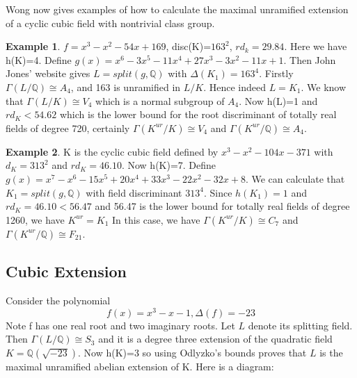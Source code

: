 \documentclass[12pt]{extarticle}
\newcommand{\Q}{\mathbb{Q}}
\newcommand{\<}{\langle}
\renewcommand{\>}{\rangle}
\theoremstyle{definition}
\newtheorem*{example}{Example}
\begin{document}
Wong now gives examples of how to calculate the maximal unramified extension of a cyclic cubic field with nontrivial class group. \begin{example}
    $f=x^3-x^2-54x+169$, disc(K)=$163^2$, $rd_{k}=29.84$. Here we have h(K)=4. Define $g(x)=x^6-3x^5-11x^4+27x^3-3x^2-11x+1$. Then John Jones' website gives $L = split(g,\mathbb{Q})$ with $\Delta(K_1)=163^4$. Firstly $\Gamma(L/\mathbb{Q}) \cong A_4$, and 163 is unramified in $L/K$. Hence indeed $L=K_1$. We know that $\Gamma(L/K)\cong V_4$ which is a normal subgroup of $A_4$. Now h(L)=1 and $rd_K < 54.62$ which is the lower bound for the root discriminant of totally real fields of degree 720, certainly $\Gamma(K^{ur}/K) \cong V_4$ and $\Gamma(K^{ur}/\mathbb{Q}) \cong A_4$. 
\end{example}
\begin{example}
K is the cyclic cubic field defined by $x^3-x^2-104x-371$ with $d_K = 313^2$
and $rd_{K} = 46.10$. Now h(K)=7. Define $g(x) = x^7-x^6-15x^5+20x^4+33x^3-22x^2-32x+8$. We can calculate that $K_1=split(g,\Q)$ with field discriminant $313^4$. Since $h(K_1) = 1$ and $rd_K = 46.10 < 56.47$ and 56.47 is the lower
bound for totally real fields of degree 1260, we have $K^{ur}=K_1$ In this
case, we have $\Gamma(K^{ur}/K) \cong C_7$ and $\Gamma(K^{ur}/\mathbb{Q}) \cong F_{21} $.  
\end{example}
\subsection{Cubic Extension}
Consider the polynomial \begin{equation}
 f(x)=x^3-x-1, \Delta(f)=-23
\end{equation}
Note f has one real root and two imaginary roots. Let $L$ denote its splitting field. Then $\Gamma(L/\mathbb{Q})\cong S_3$ and it is a degree three extension of the quadratic field $K= \mathbb{Q}(\sqrt{-23})$. Now h(K)=3 so using Odlyzko's bounds proves that $L$ is the maximal unramified abelian extension of K. Here is a diagram:
\begin{center}
\end{center}
\end{document}
